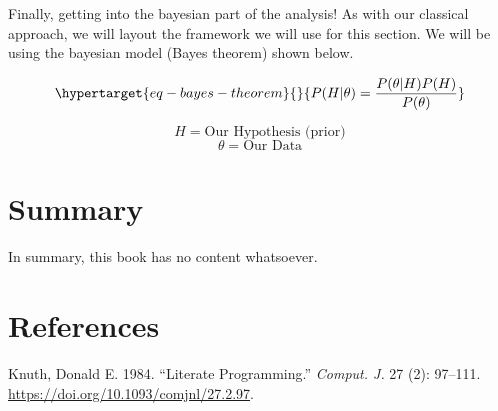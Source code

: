 \documentclass[
  letterpaper,
  DIV=11,
  numbers=noendperiod]{scrreprt}
\newlength{\cslhangindent}
\newlength{\cslentryspacingunit} %
\newenvironment{CSLReferences}[2] %
 {%
  \setlength{\parindent}{0pt}
  \ifodd #1
  \let\oldpar\par
  \def\par{\hangindent=\cslhangindent\oldpar}
  \fi
  \setlength{\parskip}{#2\cslentryspacingunit}
 }%
 {}
\begin{document}
Finally, getting into the bayesian part of the analysis! As with our
classical approach, we will layout the framework we will use for this
section. We will be using the bayesian model (Bayes theorem) shown
below.

\begin{equation}\protect\hypertarget{eq-bayes-theorem}{}{P(H|\theta) = \frac{P(\theta|H) P(H)}{P(\theta)}}\label{eq-bayes-theorem}\end{equation}

\[H = \text{Our Hypothesis (prior)}\] \[\theta = \text{Our Data}\]

\hypertarget{summary}{%
\chapter{Summary}\label{summary}}

In summary, this book has no content whatsoever.

\hypertarget{references}{%
\chapter*{References}\label{references}}


\hypertarget{refs}{}
\begin{CSLReferences}{1}{0}
\leavevmode{}%
Knuth, Donald E. 1984. {``Literate Programming.''} \emph{Comput. J.} 27
(2): 97--111. \url{https://doi.org/10.1093/comjnl/27.2.97}.

\end{CSLReferences}
\end{document}
